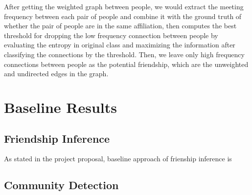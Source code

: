 \documentclass[11pt]{article}
\begin{document}
After getting the weighted graph between people, we would extract the meeting frequency between each pair of people and combine it with the ground truth of whether the pair of people are in the same affiliation, then computes the best threshold for dropping the low frequency connection between people by evaluating the entropy in original class and maximizing the information after classifying the connections by the threshold. Then, we leave only high frequency connections between people as the potential friendship, which are the unweighted and undirected edges in the graph.


\section{Baseline Results}
\subsection{Friendship Inference}
As stated in the project proposal, baseline approach of frienship inference is
\subsection{Community Detection}




%

\end{document}
